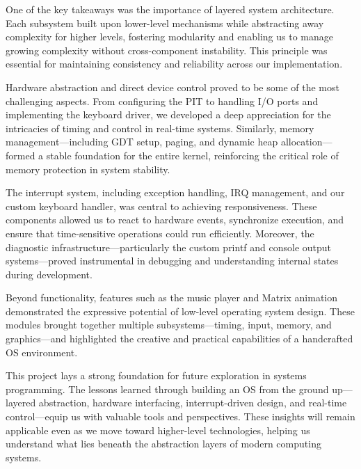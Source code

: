 \documentclass[a4paper,11pt]{article}
\begin{document}
One of the key takeaways was the importance of layered system architecture. Each subsystem built upon lower-level mechanisms while abstracting away complexity for higher levels, fostering modularity and enabling us to manage growing complexity without cross-component instability. This principle was essential for maintaining consistency and reliability across our implementation.

Hardware abstraction and direct device control proved to be some of the most challenging aspects. From configuring the PIT to handling I/O ports and implementing the keyboard driver, we developed a deep appreciation for the intricacies of timing and control in real-time systems. Similarly, memory management—including GDT setup, paging, and dynamic heap allocation—formed a stable foundation for the entire kernel, reinforcing the critical role of memory protection in system stability.

The interrupt system, including exception handling, IRQ management, and our custom keyboard handler, was central to achieving responsiveness. These components allowed us to react to hardware events, synchronize execution, and ensure that time-sensitive operations could run efficiently. Moreover, the diagnostic infrastructure—particularly the custom printf and console output systems—proved instrumental in debugging and understanding internal states during development.

Beyond functionality, features such as the music player and Matrix animation demonstrated the expressive potential of low-level operating system design. These modules brought together multiple subsystems—timing, input, memory, and graphics—and highlighted the creative and practical capabilities of a handcrafted OS environment.

This project lays a strong foundation for future exploration in systems programming. The lessons learned through building an OS from the ground up—layered abstraction, hardware interfacing, interrupt-driven design, and real-time control—equip us with valuable tools and perspectives. These insights will remain applicable even as we move toward higher-level technologies, helping us understand what lies beneath the abstraction layers of modern computing systems.

\printbibliography[heading=bibintoc]
\newpage


\end{document}

